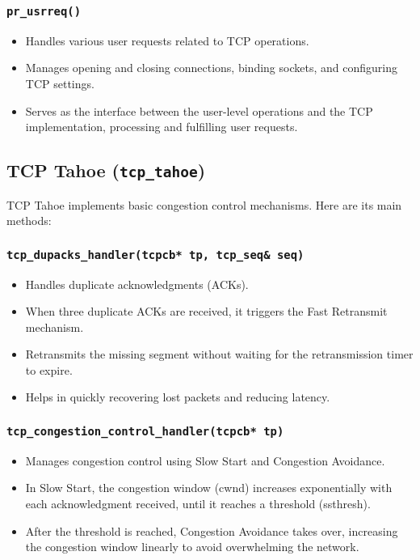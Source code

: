 \subsubsection{\texttt{\large pr\_usrreq()}}
\begin{itemize}
    \item Handles various user requests related to TCP operations.
    \item Manages opening and closing connections, binding sockets, and configuring TCP settings.
    \item Serves as the interface between the user-level operations and the TCP implementation, processing and fulfilling user requests.
\end{itemize}

\subsection{TCP Tahoe (\texttt{tcp\_tahoe})}
TCP Tahoe implements basic congestion control mechanisms. Here are its main methods:

\subsubsection{\texttt{\large tcp\_dupacks\_handler(tcpcb* tp, tcp\_seq\& seq)}}
\begin{itemize}
    \item Handles duplicate acknowledgments (ACKs).
    \item When three duplicate ACKs are received, it triggers the Fast Retransmit mechanism.
    \item Retransmits the missing segment without waiting for the retransmission timer to expire.
    \item Helps in quickly recovering lost packets and reducing latency.
\end{itemize}

\subsubsection{\texttt{\large tcp\_congestion\_control\_handler(tcpcb* tp)}}
\begin{itemize}
    \item Manages congestion control using Slow Start and Congestion Avoidance.
    \item In Slow Start, the congestion window (cwnd) increases exponentially with each acknowledgment received, until it reaches a threshold (ssthresh).
    \item After the threshold is reached, Congestion Avoidance takes over, increasing the congestion window linearly to avoid overwhelming the network.
\end{itemize}

